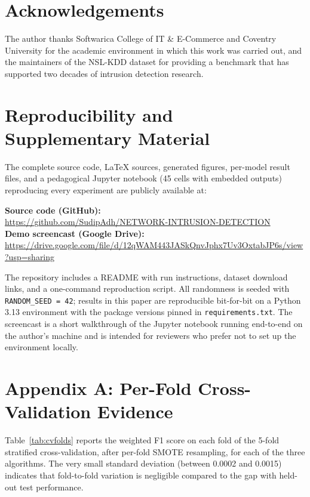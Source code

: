 \documentclass[conference, twocolumn]{IEEEtran}
\begin{document}

\section*{Acknowledgements}
The author thanks Softwarica College of IT \& E-Commerce and Coventry University for the academic environment in which this work was carried out, and the maintainers of the NSL-KDD dataset for providing a benchmark that has supported two decades of intrusion detection research.

\section*{Reproducibility and Supplementary Material}
The complete source code, LaTeX sources, generated figures, per-model result files, and a pedagogical Jupyter notebook (45 cells with embedded outputs) reproducing every experiment are publicly available at:
\begin{center}
\textbf{Source code (GitHub):}\\
\url{https://github.com/SudipAdh/NETWORK-INTRUSION-DETECTION}\\[2pt]
\textbf{Demo screencast (Google Drive):}\\
\url{https://drive.google.com/file/d/12qWAM443JASkQnvJphx7Uv3OxtabJP6s/view?usp=sharing}
\end{center}
The repository includes a README with run instructions, dataset download links, and a one-command reproduction script. All randomness is seeded with \texttt{RANDOM\_SEED = 42}; results in this paper are reproducible bit-for-bit on a Python 3.13 environment with the package versions pinned in \texttt{requirements.txt}. The screencast is a short walkthrough of the Jupyter notebook running end-to-end on the author's machine and is intended for reviewers who prefer not to set up the environment locally.

\appendix
\section*{Appendix A: Per-Fold Cross-Validation Evidence}

Table~\ref{tab:cvfolds} reports the weighted F1 score on each fold of the 5-fold stratified cross-validation, after per-fold SMOTE resampling, for each of the three algorithms. The very small standard deviation (between 0.0002 and 0.0015) indicates that fold-to-fold variation is negligible compared to the gap with held-out test performance.
\end{document}
